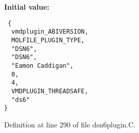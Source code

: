 {\bf Initial value:}

\footnotesize\begin{verbatim} {
  vmdplugin_ABIVERSION,   
  MOLFILE_PLUGIN_TYPE,    
  "DSN6",                 
  "DSN6",                 
  "Eamon Caddigan",       
  0,                      
  4,                      
  VMDPLUGIN_THREADSAFE,   
  "ds6"                   
}\end{verbatim}\normalsize 


Definition at line 290 of file dsn6plugin.C.
